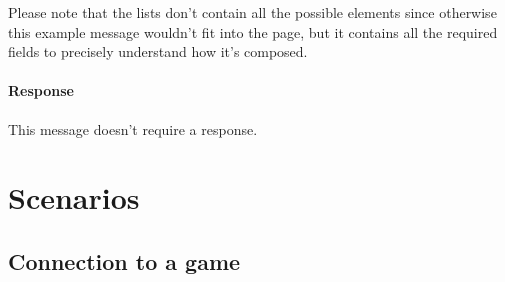 \documentclass[a4paper]{article}
\begin{document}
	Please note that the lists don't contain all the possible elements since otherwise this example message wouldn't fit into the page, but it contains all the required fields to precisely understand how it's composed.

	\paragraph{Response} This message doesn't require a response.

	\pagebreak

	\section{Scenarios}

	\subsection{Connection to a game}
\end{document}
